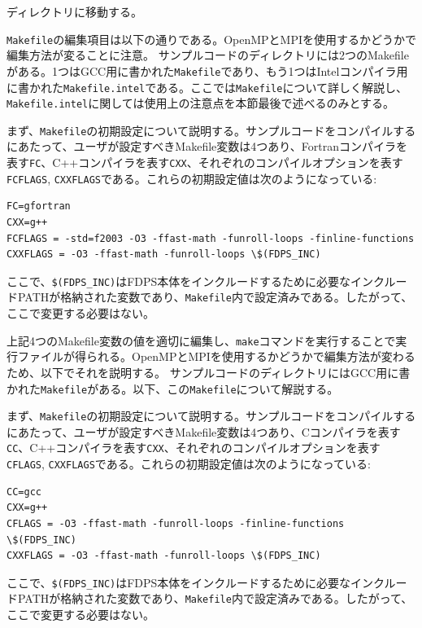 ディレクトリ\dirNameNbodySample に移動する。

\label{s3sec:how_to_edit_Makefile_in_nbody}
\ifCpp%
\texttt{Makefile}の編集項目は以下の通りである。OpenMPとMPIを使用するかどうかで編集方法が変ることに注意。
\endifCpp
\ifFtn%
サンプルコードのディレクトリには2つのMakefileがある。1つはGCC用に書かれた\texttt{Makefile}であり、もう1つはIntelコンパイラ用に書かれた\texttt{Makefile.intel}である。ここでは\texttt{Makefile}について詳しく解説し、\texttt{Makefile.intel}に関しては使用上の注意点を本節最後で述べるのみとする。

まず、\texttt{Makefile}の初期設定について説明する。サンプルコードをコンパイルするにあたって、ユーザが設定すべきMakefile変数は4つあり、Fortranコンパイラを表す\texttt{FC}、C++コンパイラを表す\texttt{CXX}、それぞれのコンパイルオプションを表す\texttt{FCFLAGS}, \texttt{CXXFLAGS}である。これらの初期設定値は次のようになっている:
\begin{screen}
\begin{Verbatim}[commandchars=\\\{\}]
FC=gfortran
CXX=g++
FCFLAGS = -std=f2003 -O3 -ffast-math -funroll-loops -finline-functions
CXXFLAGS = -O3 -ffast-math -funroll-loops \$(FDPS_INC)
\end{Verbatim}
\end{screen}
ここで、\texttt{\$(FDPS\_INC)}はFDPS本体をインクルードするために必要なインクルードPATHが格納された変数であり、\texttt{Makefile}内で設定済みである。したがって、ここで変更する必要はない。

上記4つのMakefile変数の値を適切に編集し、\texttt{make}コマンドを実行することで実行ファイルが得られる。OpenMPとMPIを使用するかどうかで編集方法が変わるため、以下でそれを説明する。
\endifFtn
\ifC%
サンプルコードのディレクトリにはGCC用に書かれた\texttt{Makefile}がある。以下、この\texttt{Makefile}について解説する。

まず、\texttt{Makefile}の初期設定について説明する。サンプルコードをコンパイルするにあたって、ユーザが設定すべきMakefile変数は4つあり、Cコンパイラを表す\texttt{CC}、C++コンパイラを表す\texttt{CXX}、それぞれのコンパイルオプションを表す\texttt{CFLAGS}, \texttt{CXXFLAGS}である。これらの初期設定値は次のようになっている:
\begin{screen}
\begin{Verbatim}[commandchars=\\\{\}]
CC=gcc
CXX=g++
CFLAGS = -O3 -ffast-math -funroll-loops -finline-functions \$(FDPS_INC)
CXXFLAGS = -O3 -ffast-math -funroll-loops \$(FDPS_INC)
\end{Verbatim}
\end{screen}
ここで、\texttt{\$(FDPS\_INC)}はFDPS本体をインクルードするために必要なインクルードPATHが格納された変数であり、\texttt{Makefile}内で設定済みである。したがって、ここで変更する必要はない。

